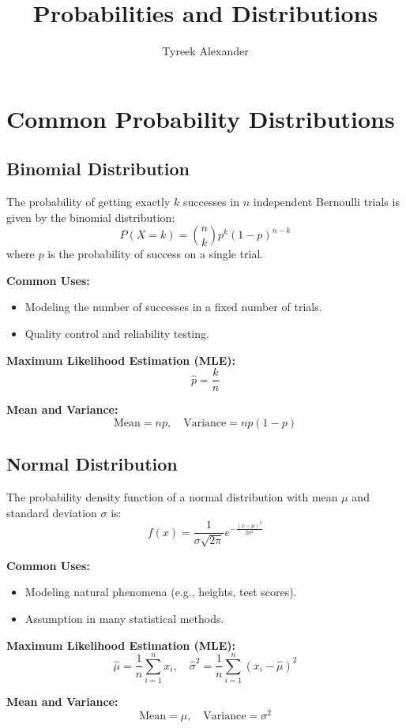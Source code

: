 \documentclass{article}
\begin{document}
\title{Probabilities and Distributions}
\author{Tyreek Alexander}
\date{}
\maketitle
\section*{Common Probability Distributions}

\subsection*{Binomial Distribution}
The probability of getting exactly \( k \) successes in \( n \) independent Bernoulli trials is given by the binomial distribution:
\[
P(X = k) = \binom{n}{k} p^k (1-p)^{n-k}
\]
where \( p \) is the probability of success on a single trial.

\textbf{Common Uses:}
\begin{itemize}
    \item Modeling the number of successes in a fixed number of trials.
    \item Quality control and reliability testing.
\end{itemize}

\textbf{Maximum Likelihood Estimation (MLE):}
\[
\hat{p} = \frac{k}{n}
\]

\textbf{Mean and Variance:}
\[
\text{Mean} = np, \quad \text{Variance} = np(1-p)
\]

\subsection*{Normal Distribution}
The probability density function of a normal distribution with mean \( \mu \) and standard deviation \( \sigma \) is:
\[
f(x) = \frac{1}{\sigma \sqrt{2\pi}} e^{-\frac{(x - \mu)^2}{2\sigma^2}}
\]

\textbf{Common Uses:}
\begin{itemize}
    \item Modeling natural phenomena (e.g., heights, test scores).
    \item Assumption in many statistical methods.
\end{itemize}

\textbf{Maximum Likelihood Estimation (MLE):}
\[
\hat{\mu} = \frac{1}{n} \sum_{i=1}^{n} x_i, \quad \hat{\sigma}^2 = \frac{1}{n} \sum_{i=1}^{n} (x_i - \hat{\mu})^2
\]

\textbf{Mean and Variance:}
\[
\text{Mean} = \mu, \quad \text{Variance} = \sigma^2
\]
\end{document}
